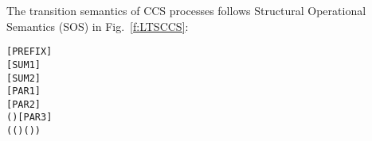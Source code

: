 The transition semantics of CCS processes follows Structural
Operational Semantics (SOS) in Fig.~\ref{f:LTSCCS}:
\begin{alltt}
\HOLTokenTurnstile{}  \HOLTokenTransBegin{}\HOLTokenTransEnd {}\hfill\texttt{[PREFIX]}
\HOLTokenTurnstile{}  \HOLTokenTransBegin{}\HOLTokenTransEnd {} \HOLSymConst{\HOLTokenImp{}}  \HOLSymConst{\ensuremath{+}}  \HOLTokenTransBegin{}\HOLTokenTransEnd {}\hfill\texttt{[SUM1]}
\HOLTokenTurnstile{}  \HOLTokenTransBegin{}\HOLTokenTransEnd {} \HOLSymConst{\HOLTokenImp{}}  \HOLSymConst{\ensuremath{+}}  \HOLTokenTransBegin{}\HOLTokenTransEnd {}\hfill\texttt{[SUM2]}
\HOLTokenTurnstile{}  \HOLTokenTransBegin{}\HOLTokenTransEnd {} \HOLSymConst{\HOLTokenImp{}}  \HOLSymConst{\ensuremath{\parallel}}  \HOLTokenTransBegin{}\HOLTokenTransEnd {} \HOLSymConst{\ensuremath{\parallel}} \hfill\texttt{[PAR1]}
\HOLTokenTurnstile{}  \HOLTokenTransBegin{}\HOLTokenTransEnd {} \HOLSymConst{\HOLTokenImp{}}  \HOLSymConst{\ensuremath{\parallel}}  \HOLTokenTransBegin{}\HOLTokenTransEnd {} \HOLSymConst{\ensuremath{\parallel}} \hfill\texttt{[PAR2]}
\HOLTokenTurnstile{}  \HOLTokenTransBegin{} \HOLTokenTransEnd {} \HOLSymConst{\HOLTokenConj{}}  \HOLTokenTransBegin{} ( )\HOLTokenTransEnd {} \HOLSymConst{\HOLTokenImp{}}  \HOLSymConst{\ensuremath{\parallel}}  \HOLTokenTransBegin\HOLSymConst{\ensuremath{\tau}}\HOLTokenTransEnd {} \HOLSymConst{\ensuremath{\parallel}} \hfill\texttt{[PAR3]}
\HOLTokenTurnstile{}  \HOLTokenTransBegin{}\HOLTokenTransEnd {} \HOLSymConst{\HOLTokenConj{}} (( \HOLSymConst{=} \HOLSymConst{\ensuremath{\tau}}) \HOLSymConst{\HOLTokenDisj{}} ( \HOLSymConst{=}  ) \HOLSymConst{\HOLTokenConj{}}  \HOLSymConst{\HOLTokenNotIn{}}  \HOLSymConst{\HOLTokenConj{}}   \HOLSymConst{\HOLTokenNotIn{}} ) \HOLSymConst{\HOLTokenImp{}}

\end{alltt}
